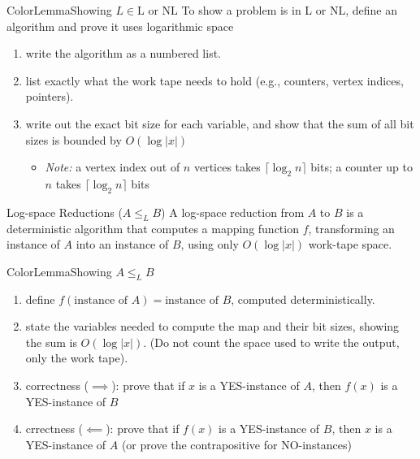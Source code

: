 \documentclass[a4paper, 11pt]{report}
\begin{document}
\begin{cframe}{ColorLemma}{Showing $L \in \text{L}$ or $\text{NL}$}
To show a problem is in L or NL, define an algorithm and prove it uses logarithmic space
    \begin{enumerate}
        \item write the algorithm as a numbered list.
        \item list exactly what the work tape needs to hold (e.g., counters, vertex indices, pointers).
        \item write out the exact bit size for each variable, and show that the sum of all bit sizes is bounded by $O(\log|x|)$
        \begin{itemize}
            \item \textit{Note:} a vertex index out of $n$ vertices takes $\lceil \log_2 n \rceil$ bits; a counter up to $n$ takes $\lceil \log_2 n \rceil$ bits
        \end{itemize}
    \end{enumerate}
\end{cframe}

\begin{defframe}{Log-space Reductions ($A \leq_{L} B$)}{}
A log-space reduction from $A$ to $B$ is a deterministic algorithm that computes a mapping function $f$, transforming an instance of $A$ into an instance of $B$, using only $O(\log|x|)$ work-tape space. 
\end{defframe}

\begin{cframe}{ColorLemma}{Showing $A \leq_{L} B$}
    \vspace{-1em}
    \begin{enumerate}
        \item define $f(\text{instance of } A) = \text{instance of } B$, computed deterministically.
        \item state the variables needed to compute the map and their bit sizes, showing the sum is $O(\log|x|)$. (Do not count the space used to write the output, only the work tape).
        \item correctness ($\implies$): prove that if $x$ is a YES-instance of $A$, then $f(x)$ is a YES-instance of $B$
    \item crrectness ($\impliedby$): prove that if $f(x)$ is a YES-instance of $B$, then $x$ is a YES-instance of $A$ (or prove the contrapositive for NO-instances)
    \end{enumerate}
\end{cframe}
\end{document}
